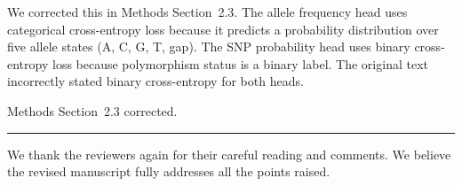 \documentclass[11pt]{article}
\begin{document}
We corrected this in Methods Section~2.3.  The allele frequency head
uses categorical cross-entropy loss because it predicts a probability
distribution over five allele states (A, C, G, T, gap).  The SNP
probability head uses binary cross-entropy loss because polymorphism
status is a binary label.  The original text incorrectly stated binary
cross-entropy for both heads.

Methods Section~2.3 corrected.

\bigskip
\hrule
\bigskip

We thank the reviewers again for their careful reading and comments.
We believe the revised manuscript fully addresses all the points raised.
\end{document}
